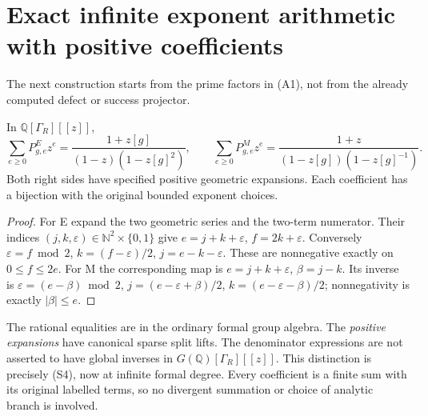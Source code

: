 \section{Exact infinite exponent arithmetic with positive coefficients}
The next construction starts from the prime factors in (A1), not from the
already computed defect or success projector.

\begin{theorem}
In $\mathbb Q[\Gamma_R][[z]]$,
\[
 \boxed{\sum_{e\ge0}P^E_{g,e}z^e
  =\frac{1+z[g]}{(1-z)(1-z[g]^2)},\qquad
 \sum_{e\ge0}P^M_{g,e}z^e
  =\frac{1+z}{(1-z[g])(1-z[g]^{-1})}.}
 \tag{P1}
\]
Both right sides have specified positive geometric expansions. Each coefficient
has a bijection with the original bounded exponent choices.
\end{theorem}
\begin{proof}
For E expand the two geometric series and the two-term numerator. Their
indices $(j,k,\varepsilon)\in\mathbb N^2\times\{0,1\}$ give
$e=j+k+\varepsilon$, $f=2k+\varepsilon$. Conversely
$\varepsilon=f\bmod2$, $k=(f-\varepsilon)/2$,
$j=e-k-\varepsilon$. These are nonnegative exactly on $0\le f\le2e$.
For M the corresponding map is
$e=j+k+\varepsilon$, $\beta=j-k$. Its inverse is
$\varepsilon=(e-\beta)\bmod2$,
$j=(e-\varepsilon+\beta)/2$, $k=(e-\varepsilon-\beta)/2$;
nonnegativity is exactly $|\beta|\le e$.
\end{proof}
The rational equalities are in the ordinary formal group algebra. The
\emph{positive expansions} have canonical sparse split lifts. The denominator
expressions are not asserted to have global inverses in $G(\mathbb Q)[\Gamma_R][[z]]$.
This distinction is precisely (S4), now at infinite formal degree. Every
coefficient is a finite sum with its original labelled terms, so no divergent
summation or choice of analytic branch is involved.

